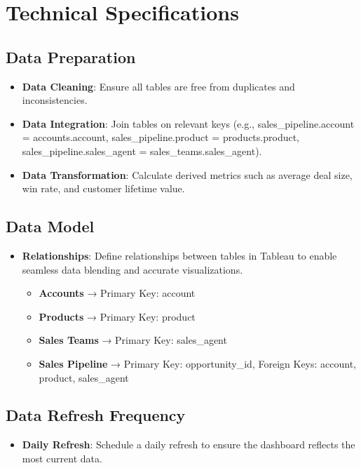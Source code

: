 \documentclass{article}
\begin{document}
\section{Technical Specifications}

\subsection{Data Preparation}
\begin{itemize}
    \item \textbf{Data Cleaning}: Ensure all tables are free from duplicates and inconsistencies.
    \item \textbf{Data Integration}: Join tables on relevant keys (e.g., sales\_pipeline.account = accounts.account, sales\_pipeline.product = products.product, sales\_pipeline.sales\_agent = sales\_teams.sales\_agent).
    \item \textbf{Data Transformation}: Calculate derived metrics such as average deal size, win rate, and customer lifetime value.
\end{itemize}

\subsection{Data Model}
\begin{itemize}
    \item \textbf{Relationships}: Define relationships between tables in Tableau to enable seamless data blending and accurate visualizations.
    \begin{itemize}
        \item \textbf{Accounts} → Primary Key: account
        \item \textbf{Products} → Primary Key: product
        \item \textbf{Sales Teams} → Primary Key: sales\_agent
        \item \textbf{Sales Pipeline} → Primary Key: opportunity\_id, Foreign Keys: account, product, sales\_agent
    \end{itemize}
\end{itemize}

\subsection{Data Refresh Frequency}
\begin{itemize}
    \item \textbf{Daily Refresh}: Schedule a daily refresh to ensure the dashboard reflects the most current data.
\end{itemize}
\end{document}
